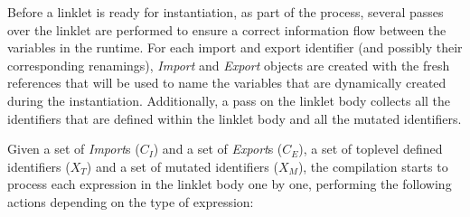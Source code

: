 
Before a linklet is ready for instantiation, as part of the
 process, several passes over the linklet are
performed to ensure a correct information flow between the variables
in the run\dash time. For each import and export identifier (and
possibly their corresponding renamings), \emph{Import} and
\emph{Export} objects are created with the fresh references that
will be used to name the variables that are dynamically created during
the instantiation. Additionally, a pass on the linklet body collects
all the identifiers that are defined within the linklet body and all
the mutated identifiers.

Given a set of \emph{Import}s ($\mathit{C_I}$) and a set of
\emph{Export}s ($\mathit{C_E}$), a set of toplevel defined
identifiers ($\mathit{X_T}$) and a set of mutated identifiers
($\mathit{X_M}$), the compilation starts to process each expression in
the linklet body one by one, performing the following actions
depending on the type of expression:

